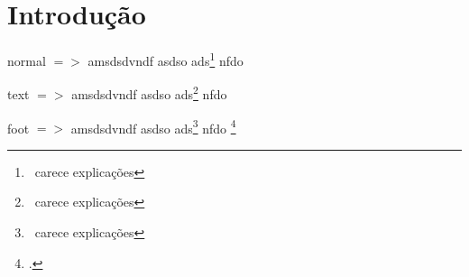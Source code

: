 \chapter{Introdução}
\pagestyle{fancy}


normal $=>$ amsdsdvndf asdso ads\footnote{\ carece explicações} nfdo \cite[p. 51]{a}

text $=>$ amsdsdvndf asdso ads\footnote{\ carece explicações} nfdo \textcite[p. 51]{a}

foot $=>$ amsdsdvndf asdso ads\footnote{\ carece explicações} nfdo \footcite[p. 51]{a}

\lipsum
